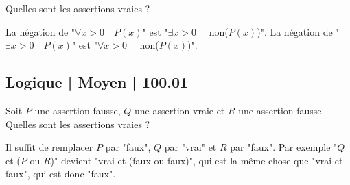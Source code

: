 \begin{question}

Quelles sont les assertions vraies ?
\begin{answers}



\end{answers}
\begin{explanations}
La négation de "$\forall x > 0 \quad P(x)$" est "$\exists x > 0 \quad$ non($P(x)$)".
La négation de "$\exists x > 0 \quad P(x)$" est "$\forall x > 0 \quad$ non($P(x)$)".
\end{explanations}
\end{question}

\subsection{Logique | Moyen | 100.01}


\begin{question}

Soit $P$ une assertion fausse, $Q$ une assertion vraie et $R$ une assertion fausse. Quelles sont les assertions vraies ?
\begin{answers}



\end{answers}
\begin{explanations}
Il suffit de remplacer $P$ par "faux", $Q$ par "vrai" et $R$ par "faux". Par exemple "$Q$ et ($P$ ou $R$)" devient "vrai et (faux ou faux)", qui est la même chose que "vrai et faux", qui est donc "faux".
\end{explanations}
\end{question}


